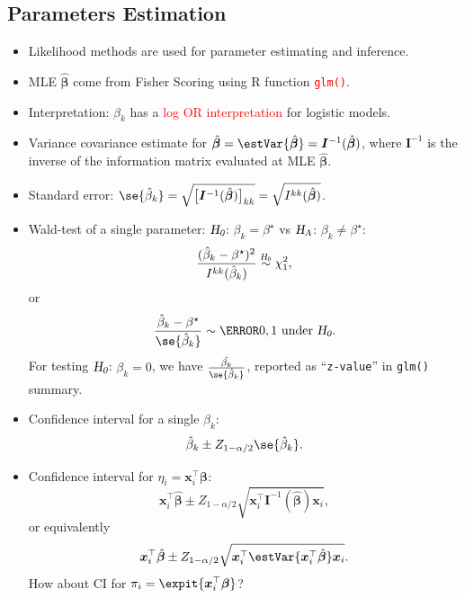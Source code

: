 \documentclass{article}\usepackage[]{graphicx}\usepackage[svgnames]{xcolor}
\newcommand{\HN}{\textsl{H}_{\textsl{0}}}%
\newcommand{\HA}{\textsl{H}_{\textsl{A}}}%
\providecommand{\Vector}[1]{\bm{#1}}%
\providecommand{\Matrix}[1]{\bm{#1}}
\begin{document}
\subsection*{Parameters Estimation}
\begin{itemize}
      \item Likelihood methods are used for parameter estimating and inference.
      \item MLE $ \hat{\Vector{\beta}} $ come from Fisher Scoring using R function \textcolor{Red}{\texttt{glm()}}.
      \item Interpretation: $ \beta_k $ has a \textcolor{Red}{log OR interpretation} for logistic models.
      \item Variance covariance estimate for $ \hat{\Vector{\beta}}=\estVar{\hat{\Vector{\beta}}}=\Matrix{I}^{-1}(\hat{\Vector{\beta}}) $,
            where $ \Matrix{I}^{-1} $ is the inverse of the information matrix evaluated at MLE $ \hat{\Vector{\beta}} $.
      \item Standard error: $ \se{\hat{\beta}_k}=\sqrt{\bigl[\Matrix{I}^{-1}(\hat{\Vector{\beta}})\bigr]_{kk}}=\sqrt{I^{kk}(\hat{\Vector{\beta}})} $.
      \item Wald-test of a single parameter: $ \HN $: $ \beta_k=\beta^\star $ vs $ \HA $: $ \beta_k\ne \beta^\star $:
            \[ \frac{(\hat{\beta}_k-\beta^\star)^2}{I^{kk}(\hat{\beta}_k)}\stackrel{\HN}{\sim}\chi^2_1,  \]
            or
            \[ \frac{\hat{\beta}_k-\beta^\star}{\se{\hat{\beta}_k}}\sim \N{0,1}\text{ under $ \HN $}.  \]
            For testing $ \HN $: $ \beta_k=0 $, we have $ \frac{\hat{\beta_k}}{\se{\hat{\beta}_k}} $, reported as ``\texttt{z-value}'' in \texttt{glm()} summary.
      \item Confidence interval for a single $ \beta_k $:
            \[ \hat{\beta}_k\pm Z_{1-\alpha/2}\se{\hat{\beta}_k}. \]
      \item Confidence interval for $ \eta_i=\Vector{x}_i^\top \Vector{\beta} $:
            \[ \Vector{x}_i^\top \hat{\Vector{\beta}}\pm Z_{1-\alpha/2}\sqrt{\Vector{x}_i^\top \Matrix{I}^{-1}(\hat{\Vector{\beta}})\Vector{x}_i}, \]
            or equivalently
            \[ \Vector{x}_i^\top \hat{\Vector{\beta}}\pm Z_{1-\alpha/2}\sqrt{\Vector{x}_i^\top \estVar{\Vector{x}_i^\top \hat{\Vector{\beta}}}\Vector{x}_i}. \]
            How about CI for $ \pi_i=\expit{\Vector{x}_i^\top \Vector{\beta}} $?
\end{itemize}
\end{document}
